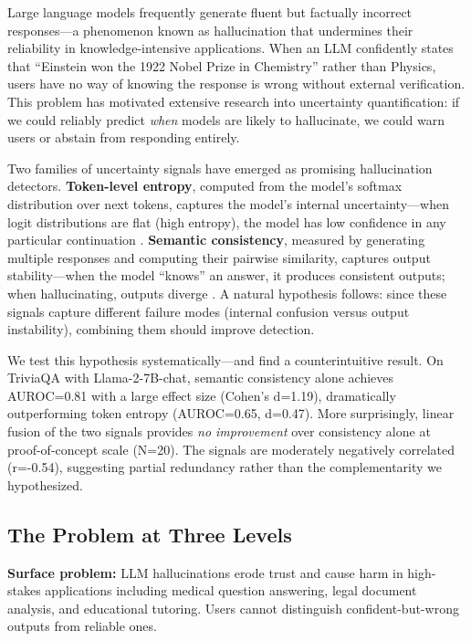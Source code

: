 Large language models frequently generate fluent but factually incorrect responses---a phenomenon known as hallucination that undermines their reliability in knowledge-intensive applications. When an LLM confidently states that ``Einstein won the 1922 Nobel Prize in Chemistry'' rather than Physics, users have no way of knowing the response is wrong without external verification. This problem has motivated extensive research into uncertainty quantification: if we could reliably predict \emph{when} models are likely to hallucinate, we could warn users or abstain from responding entirely.

Two families of uncertainty signals have emerged as promising hallucination detectors. \textbf{Token-level entropy}, computed from the model's softmax distribution over next tokens, captures the model's internal uncertainty---when logit distributions are flat (high entropy), the model has low confidence in any particular continuation \citep{kuhn2023semantic}. \textbf{Semantic consistency}, measured by generating multiple responses and computing their pairwise similarity, captures output stability---when the model ``knows'' an answer, it produces consistent outputs; when hallucinating, outputs diverge \citep{manakul2023selfcheckgpt}. A natural hypothesis follows: since these signals capture different failure modes (internal confusion versus output instability), combining them should improve detection.

We test this hypothesis systematically---and find a counterintuitive result. On TriviaQA with Llama-2-7B-chat, semantic consistency alone achieves AUROC=0.81 with a large effect size (Cohen's d=1.19), dramatically outperforming token entropy (AUROC=0.65, d=0.47). More surprisingly, linear fusion of the two signals provides \emph{no improvement} over consistency alone at proof-of-concept scale (N=20). The signals are moderately negatively correlated (r=-0.54), suggesting partial redundancy rather than the complementarity we hypothesized.

\subsection{The Problem at Three Levels}

\textbf{Surface problem:} LLM hallucinations erode trust and cause harm in high-stakes applications including medical question answering, legal document analysis, and educational tutoring. Users cannot distinguish confident-but-wrong outputs from reliable ones.

